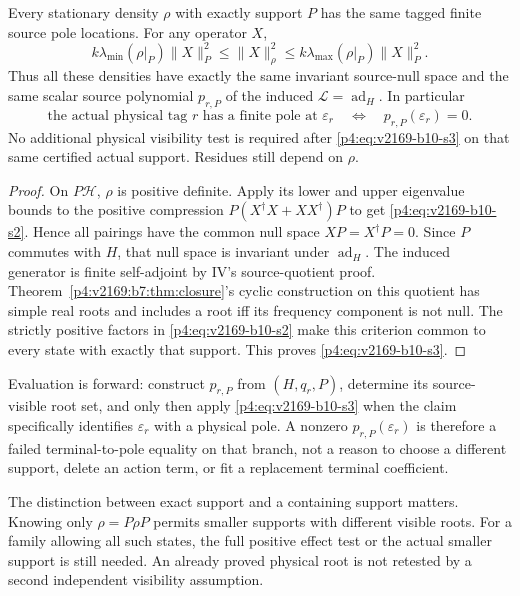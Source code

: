 \documentclass[12pt,a4paper]{article}
\begin{document}
\begin{theorem}
\label{p4:v2169:b10:thm:support}
Every stationary density $\rho$ with exactly support $P$ has the same
tagged finite source pole locations. For any operator $X$,
\begin{equation}
 k\lambda_{\min}(\rho|_P)\|X\|_P^2
 \leq\|X\|_\rho^2
 \leq k\lambda_{\max}(\rho|_P)\|X\|_P^2.
 \label{p4:eq:v2169-b10-s2}
\end{equation}
Thus all these densities have exactly the same invariant source-null space
and the same scalar source polynomial $p_{r,P}$ of the induced
$\mathcal L=\operatorname{ad}_H$. In particular
\begin{equation}
 \boxed{\text{the actual physical tag }r\text{ has a finite pole at }
 \varepsilon_r\quad\Longleftrightarrow\quad
                         p_{r,P}(\varepsilon_r)=0.}
 \label{p4:eq:v2169-b10-s3}
\end{equation}
No additional physical visibility test is required after \eqref{p4:eq:v2169-b10-s3} on that same
certified actual support. Residues still depend on $\rho$.
\end{theorem}
\begin{proof}
On $P\mathcal H$, $\rho$ is positive definite. Apply its lower and upper
eigenvalue bounds to the positive compression
$P(X^\dagger X+XX^\dagger)P$ to get \eqref{p4:eq:v2169-b10-s2}.
Hence all pairings have the common null space $XP=X^\dagger P=0$.
Since $P$ commutes with $H$, that null space is invariant under $\operatorname{ad}_H$.
The induced generator is finite self-adjoint by IV's source-quotient proof.
Theorem~\ref{p4:v2169:b7:thm:closure}'s cyclic construction on this quotient has simple real roots and
includes a root iff its frequency component is not null. The strictly
positive factors in \eqref{p4:eq:v2169-b10-s2} make this criterion common to every state with
exactly that support. This proves \eqref{p4:eq:v2169-b10-s3}.
\end{proof}

Evaluation is forward: construct $p_{r,P}$ from $(H,q_r,P)$, determine its
source-visible root set, and only then apply
\eqref{p4:eq:v2169-b10-s3} when the claim specifically identifies
$\varepsilon_r$ with a physical pole.  A nonzero
$p_{r,P}(\varepsilon_r)$ is therefore a failed terminal-to-pole equality on
that branch, not a reason to choose a different support, delete an action term,
or fit a replacement terminal coefficient.

The distinction between exact support and a containing support matters.
Knowing only $\rho=P\rho P$ permits smaller supports with different visible
roots. For a family allowing all such states, the full positive effect test
or the actual smaller support is still needed. An already proved physical
root is not retested by a second independent visibility assumption.
\end{document}
